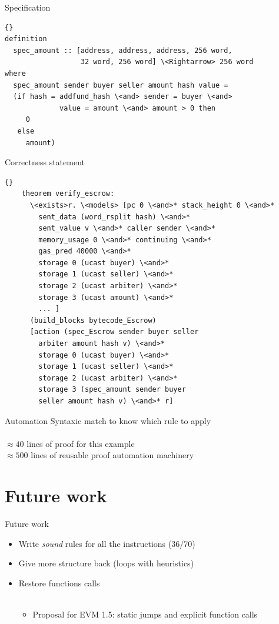 \documentclass{beamer}
\begin{document}
	\begin{frame}[fragile]{Specification}
		\begin{lstlisting}[language=Isar,keywords={[3]{addfund\_hash,pay\_hash,refund\_hash,}}]{} 
definition
  spec_amount :: [address, address, address, 256 word, 
                  32 word, 256 word] \<Rightarrow> 256 word
where
  spec_amount sender buyer seller amount hash value =
  (if hash = addfund_hash \<and> sender = buyer \<and>
             value = amount \<and> amount > 0 then
     0
   else
     amount)
\end{lstlisting}	
\end{frame}

\begin{frame}[fragile]{Correctness statement}
	\begin{lstlisting}[language=Isar,keywords={[3]{hash,sender,buyer,seller,arbiter,amount,v}}]{}
	theorem verify_escrow:
	  \<exists>r. \<models> [pc 0 \<and>* stack_height 0 \<and>*
	    sent_data (word_rsplit hash) \<and>*
	    sent_value v \<and>* caller sender \<and>*
	    memory_usage 0 \<and>* continuing \<and>*
	    gas_pred 40000 \<and>*
	    storage 0 (ucast buyer) \<and>*
	    storage 1 (ucast seller) \<and>*
	    storage 2 (ucast arbiter) \<and>*
	    storage 3 (ucast amount) \<and>*
	    ... ]
	  (build_blocks bytecode_Escrow)
	  [action (spec_Escrow sender buyer seller
	    arbiter amount hash v) \<and>*
	    storage 0 (ucast buyer) \<and>*
	    storage 1 (ucast seller) \<and>*
	    storage 2 (ucast arbiter) \<and>*
	    storage 3 (spec_amount sender buyer
	    seller amount hash v) \<and>* r]
	\end{lstlisting}
\end{frame}

\begin{frame}{Automation}
	\centering
	Syntaxic match to know which rule to apply
	\\~\\
	$\approx 40$ lines of proof for this example \\
	$\approx 500$ lines of reusable
	proof automation machinery
\end{frame}

\part{Future work}
\frame{\partpage}

\begin{frame}{Future work}
	\begin{itemize}
		\item Write \emph{sound} rules for all the instructions (36/70)
		\item Give more structure back (loops with heuristics)
		\item Restore functions calls
		\\~\\
		\begin{itemize}
			\item Proposal for EVM 1.5: static jumps and explicit function calls
		\end{itemize}
	\end{itemize}
\end{frame}
\end{document}
